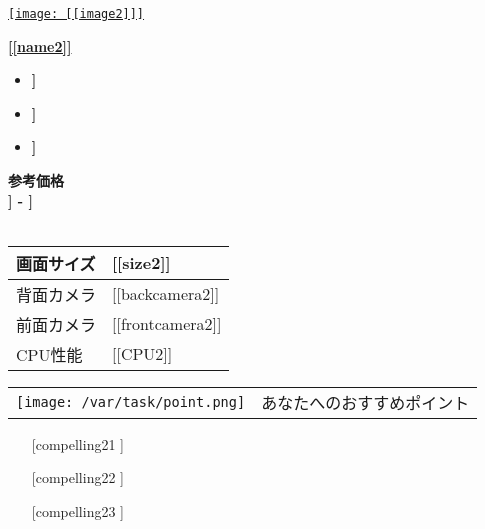 \documentclass[lualatex,paper=a4,airticle]{jlreq}
\begin{document}
\begin{minipage}[b][0.43\textheight][b]{\textwidth}
  \begin{minipage}{0.23\textwidth}
    \href{[[url1]]}{
    \texttt{[image: [[image2]]]} %
    }
    \end{minipage}%
    \hfill
    \begin{minipage}{0.77\textwidth}
    \href{[[url1]]}{\huge{\textbf{[[name2]]}}}\par
    \begin{itemize}
    \item {\color{Purple}\mcfamily\bfseries\myfont [[description21]]}
    \item {\color{Purple}\mcfamily\bfseries\myfont [[description22]]}
    \item {\color{Purple}\mcfamily\bfseries\myfont [[description23]]}
    \end{itemize}
    \end{minipage}
    \vspace{-1\baselineskip}
    \begin{multicols}{2}
    {\color{red}\textbf{参考価格}}\\
    {\LARGE\color{red}\textbf{\textyen [[lprice2]] - \textyen [[hprice2]]}}\\
    \\
      \begin{minipage}{0.75\columnwidth}
      \begin{tabular}{l p{4.5cm}}
      \hline
      画面サイズ & [[size2]] \\
      \hline
      背面カメラ & [[backcamera2]] \\
      \hline
      前面カメラ & [[frontcamera2]] \\
      \hline
      CPU性能 & [[CPU2]] \\
      \hline
      \end{tabular}
      \end{minipage}
    
    \columnbreak
    
    \hspace{-2.3cm} %
      \begin{minipage}{1.25\columnwidth}
      \vspace{-0.4cm}
      \begin{itembox}[l]{
      \begin{tabular}{@{}m{9mm}@{}m{6cm}}
        \texttt{[image: /var/task/point.png]} & \gtfamily\ebseries\large あなたへのおすすめポイント
      \end{tabular}
    }
       \vspace{-1\baselineskip}
    \begin{itemize}
    \setlength{\itemindent}{-10pt}
    \item [[compelling21]]
    \item [[compelling22]]
    \item [[compelling23]]
    \end{itemize}
    \end{itembox}
      \end{minipage}
    

\end{multicols}
\end{minipage}
\end{document}
